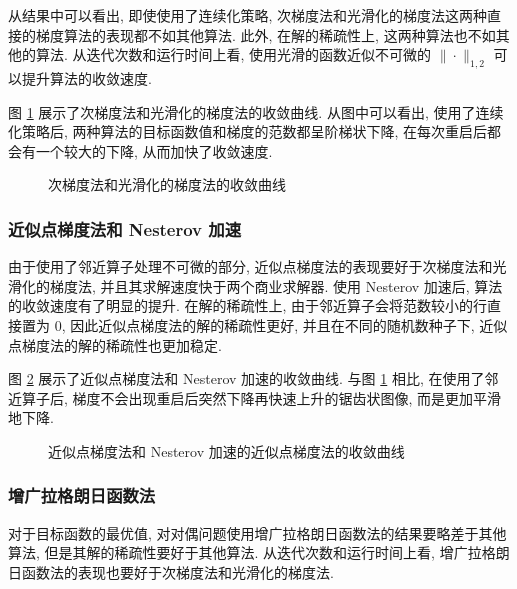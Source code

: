 \documentclass{article}
\begin{document}
从结果中可以看出, 即使使用了连续化策略, 次梯度法和光滑化的梯度法这两种直接的梯度算法的表现都不如其他算法. 此外, 在解的稀疏性上, 这两种算法也不如其他的算法. 从迭代次数和运行时间上看, 使用光滑的函数近似不可微的 $\|\cdot\|_{1,2}$ 可以提升算法的收敛速度.

图 \ref{fig:gd} 展示了次梯度法和光滑化的梯度法的收敛曲线. 从图中可以看出, 使用了连续化策略后, 两种算法的目标函数值和梯度的范数都呈阶梯状下降, 在每次重启后都会有一个较大的下降, 从而加快了收敛速度.

\begin{figure}[h]
    \centering
    \caption{次梯度法和光滑化的梯度法的收敛曲线}
    \label{fig:gd}
\end{figure}

\subsubsection{近似点梯度法和 Nesterov 加速}

由于使用了邻近算子处理不可微的部分, 近似点梯度法的表现要好于次梯度法和光滑化的梯度法, 并且其求解速度快于两个商业求解器. 使用 Nesterov 加速后, 算法的收敛速度有了明显的提升. 在解的稀疏性上, 由于邻近算子会将范数较小的行直接置为 0, 因此近似点梯度法的解的稀疏性更好, 并且在不同的随机数种子下, 近似点梯度法的解的稀疏性也更加稳定.

图 \ref{fig:prox} 展示了近似点梯度法和 Nesterov 加速的收敛曲线. 与图 \ref{fig:gd} 相比, 在使用了邻近算子后, 梯度不会出现重启后突然下降再快速上升的锯齿状图像, 而是更加平滑地下降.

\begin{figure}[h]
    \centering
    \caption{近似点梯度法和 Nesterov 加速的近似点梯度法的收敛曲线}
    \label{fig:prox}
\end{figure}

\subsubsection{增广拉格朗日函数法}

对于目标函数的最优值, 对对偶问题使用增广拉格朗日函数法的结果要略差于其他算法, 但是其解的稀疏性要好于其他算法. 从迭代次数和运行时间上看, 增广拉格朗日函数法的表现也要好于次梯度法和光滑化的梯度法.
\end{document}
